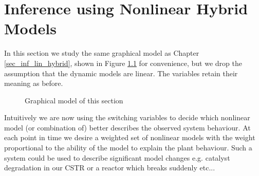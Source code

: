 \chapter{Inference using Nonlinear Hybrid Models}
\label{sec_inf_spf}
In this section we study the same graphical model as Chapter \ref{sec_inf_lin_hybrid}, shown in Figure \ref{fig_hybridmod2} for convenience, but we drop the assumption that the dynamic models are linear. The variables retain their meaning as before.     
\begin{figure}[H] 
\centering
{}
\caption{Graphical model of this section}
\label{fig_hybridmod2}
\end{figure}
Intuitively we are now using the switching variables to decide which nonlinear model (or combination of) better describes the observed system behaviour. At each point in time we desire a weighted set of nonlinear models with the weight proportional to the ability of the model to explain the plant behaviour. Such a system could be used to describe significant model changes e.g. catalyst degradation in our CSTR or a reactor which breaks suddenly etc... 

